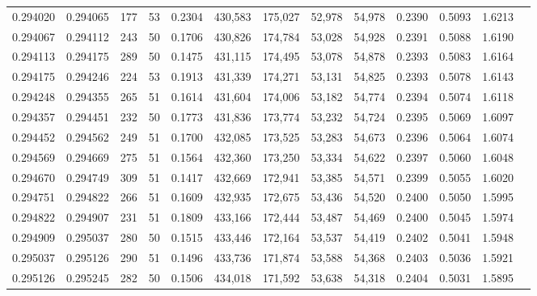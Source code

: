 \begin{tabular}{rrrrrrrrrrrrr}
0.294020 & 0.294065 &   177 &  53 &                                     0.2304 & 430,583 & 175,027 &  52,978 &  54,978 & 0.2390 & 0.5093 & 1.6213 \\
0.294067 & 0.294112 &   243 &  50 &                                     0.1706 & 430,826 & 174,784 &  53,028 &  54,928 & 0.2391 & 0.5088 & 1.6190 \\
0.294113 & 0.294175 &   289 &  50 &                                     0.1475 & 431,115 & 174,495 &  53,078 &  54,878 & 0.2393 & 0.5083 & 1.6164 \\
0.294175 & 0.294246 &   224 &  53 &                                     0.1913 & 431,339 & 174,271 &  53,131 &  54,825 & 0.2393 & 0.5078 & 1.6143 \\
0.294248 & 0.294355 &   265 &  51 &                                     0.1614 & 431,604 & 174,006 &  53,182 &  54,774 & 0.2394 & 0.5074 & 1.6118 \\
0.294357 & 0.294451 &   232 &  50 &                                     0.1773 & 431,836 & 173,774 &  53,232 &  54,724 & 0.2395 & 0.5069 & 1.6097 \\
0.294452 & 0.294562 &   249 &  51 &                                     0.1700 & 432,085 & 173,525 &  53,283 &  54,673 & 0.2396 & 0.5064 & 1.6074 \\
0.294569 & 0.294669 &   275 &  51 &                                     0.1564 & 432,360 & 173,250 &  53,334 &  54,622 & 0.2397 & 0.5060 & 1.6048 \\
0.294670 & 0.294749 &   309 &  51 &                                     0.1417 & 432,669 & 172,941 &  53,385 &  54,571 & 0.2399 & 0.5055 & 1.6020 \\
0.294751 & 0.294822 &   266 &  51 &                                     0.1609 & 432,935 & 172,675 &  53,436 &  54,520 & 0.2400 & 0.5050 & 1.5995 \\
0.294822 & 0.294907 &   231 &  51 &                                     0.1809 & 433,166 & 172,444 &  53,487 &  54,469 & 0.2400 & 0.5045 & 1.5974 \\
0.294909 & 0.295037 &   280 &  50 &                                     0.1515 & 433,446 & 172,164 &  53,537 &  54,419 & 0.2402 & 0.5041 & 1.5948 \\
0.295037 & 0.295126 &   290 &  51 &                                     0.1496 & 433,736 & 171,874 &  53,588 &  54,368 & 0.2403 & 0.5036 & 1.5921 \\
0.295126 & 0.295245 &   282 &  50 &                                     0.1506 & 434,018 & 171,592 &  53,638 &  54,318 & 0.2404 & 0.5031 & 1.5895 \\

\end{tabular}
